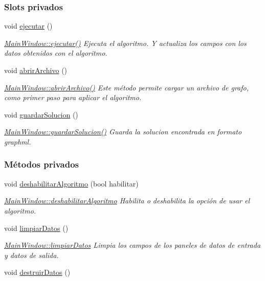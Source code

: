 \subsubsection*{Slots privados}
\begin{DoxyCompactItemize}
\item 
void \hyperlink{class_main_window_a957d9751c06e3d563c12f8deac28bd0a}{ejecutar} ()
\begin{DoxyCompactList}\small\item\em \hyperlink{class_main_window_a957d9751c06e3d563c12f8deac28bd0a}{Main\-Window\-::ejecutar()} Ejecuta el algoritmo. Y actualiza los campos con los datos obtenidos con el algoritmo. \end{DoxyCompactList}\item 
void \hyperlink{class_main_window_a26d568bd0afde2853dbf4d1d376e5983}{abrir\-Archivo} ()
\begin{DoxyCompactList}\small\item\em \hyperlink{class_main_window_a26d568bd0afde2853dbf4d1d376e5983}{Main\-Window\-::abrir\-Archivo()} Este m\'{e}todo permite cargar un archivo de grafo, como primer paso para aplicar el algoritmo. \end{DoxyCompactList}\item 
void \hyperlink{class_main_window_a05df693b04b7468859a1927de1002455}{guardar\-Solucion} ()
\begin{DoxyCompactList}\small\item\em \hyperlink{class_main_window_a05df693b04b7468859a1927de1002455}{Main\-Window\-::guardar\-Solucion()} Guarda la solucion encontrada en formato {\itshape graphml}. \end{DoxyCompactList}\end{DoxyCompactItemize}
\subsubsection*{Métodos privados}
\begin{DoxyCompactItemize}
\item 
void \hyperlink{class_main_window_af241cf8ff6b2e4a17558e6487d705331}{deshabilitar\-Algoritmo} (bool habilitar)
\begin{DoxyCompactList}\small\item\em \hyperlink{class_main_window_af241cf8ff6b2e4a17558e6487d705331}{Main\-Window\-::deshabilitar\-Algoritmo} Habilita o deshabilita la opci\'{o}n de usar el algoritmo. \end{DoxyCompactList}\item 
void \hyperlink{class_main_window_a4678687dacfc0628fbb70a784eaf5ccb}{limpiar\-Datos} ()
\begin{DoxyCompactList}\small\item\em \hyperlink{class_main_window_a4678687dacfc0628fbb70a784eaf5ccb}{Main\-Window\-::limpiar\-Datos} Limpia los campos de los paneles de datos de entrada y datos de salida. \end{DoxyCompactList}\item 
void \hyperlink{class_main_window_ac851388477837047f7246785cddcd432}{destruir\-Datos} ()
\end{DoxyCompactItemize}
